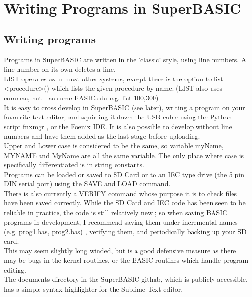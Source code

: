 \chapter{Writing Programs in SuperBASIC}

\section {Writing programs}
Programs in SuperBASIC are written in the 'classic' style, using line numbers. A line number on its own deletes a line.\\

LIST operates as in most other systems, except there is the option to list <procedure>() which lists the given procedure by name. (LIST also uses commas, not - as some BASICs do e.g. list 100,300)\\

It is easy to cross develop in SuperBASIC (see later), writing a program on your favourite text editor, and squirting it down the USB cable using the Python script fnxmgr , or the Foenix IDE. It is also possible to develop without line numbers and have them added as the last stage before uploading.\\

Upper and Lower case is considered to be the same, so variable myName, MYNAME and MyName are all the same variable. The only place where case is specifically differentiated is in string constants.\\

Programs can be loaded or saved to SD Card or to an IEC type drive (the 5 pin DIN serial port) using the SAVE and LOAD command.\\

There is also currently a VERIFY command whose purpose it is to check files have been saved correctly. While the SD Card and IEC code has been seen to be reliable in practice, the code is still relatively new ; so when saving BASIC programs in development, I recommend saving them under incremental names (e.g. prog1.bas, prog2.bas) , verifying them, and periodically backing up your SD card.\\

This may seem slightly long winded, but is a good defensive measure as there may be bugs in the kernel routines, or the BASIC routines which handle program editing. \\

The documents directory in the SuperBASIC github, which is publicly accessible, has a simple syntax highlighter for the Sublime Text editor.\\